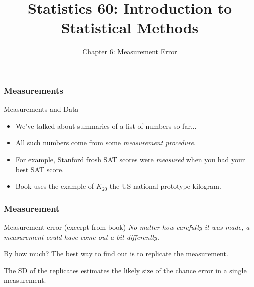 \documentclass[handout]{beamer}
\title{Statistics 60: Introduction to Statistical Methods}
\subtitle{Chapter 6: Measurement Error}
\author{}%
\begin{document}
   \begin{frame}
   \titlepage
   \end{frame}


   \begin{frame} \frametitle{Measurements}

   \begin{block}
   {Measurements and Data}
   \begin{itemize}
   \item We've talked about summaries of a list of numbers so far...
   \item All such numbers come from some {\em measurement procedure}.
   \item For example, Stanford frosh SAT scores were {\em measured}
   when you had your best SAT score.
   \item Book uses the example of $K_{20}$ the US national
   prototype kilogram.
   \end{itemize}
   \end{block}
   \end{frame}


   \begin{frame} \frametitle{Measurement}

   \begin{block}
   {Measurement error (excerpt from book)}
   {\em No matter how carefully it was made, a measurement could have
   come out a bit differently.}

   \end{block}

   \begin{block}
   {By how much?}
   The best way to find out is to replicate the measurement.

   The SD of the replicates estimates the likely
   size of the chance error in a single measurement.

   \end{block}
   \end{frame}

\end{document}
